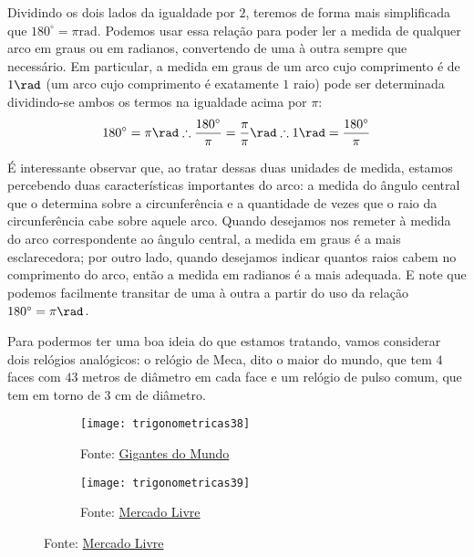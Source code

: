 Dividindo os dois lados da igualdade por $2$, teremos de forma mais simplificada que $180^{\circ}=\pi \mathrm{rad}$. Podemos usar essa relação para poder ler a medida de qualquer arco em graus ou em radianos, convertendo de uma à outra sempre que necessário. Em particular, a medida em graus de um arco cujo comprimento é de $1\rad$ (um arco cujo comprimento é exatamente $1$ raio) pode ser determinada dividindo-se ambos os termos na igualdade acima por $\pi$:
\begin{equation*}
180^{\circ}=\pi \rad\therefore\frac{180^{\circ}}{\pi}=\frac{\pi}{\pi} \rad\therefore1 \rad=\frac{180^{\circ}}{\pi}
\end{equation*}

\begin{observation}{}
É interessante observar que, ao tratar dessas duas unidades de medida, estamos percebendo duas características importantes do arco: a medida do ângulo central que o determina sobre a circunferência e a quantidade de vezes que o raio da circunferência cabe sobre aquele arco. Quando desejamos nos remeter à medida do arco correspondente ao ângulo central, a medida em graus é a mais esclarecedora; por outro lado, quando desejamos indicar quantos raios cabem no comprimento do arco, então a medida em radianos é a mais adequada. E note que podemos facilmente transitar de uma à outra a partir do uso da relação $180^{\circ}=\pi\rad$.
\end{observation}


Para podermos ter uma boa ideia do que estamos tratando, vamos considerar dois relógios analógicos: o relógio de Meca, dito o maior do mundo, que tem $4$ faces com $43$ metros de diâmetro em cada face e um relógio de pulso comum, que tem em torno de $3$ cm de diâmetro.

\begin{figure}[H]
\centering

\begin{minipage}{.45\linewidth}
\begin{figure}[H]
\centering

\texttt{[image: trigonometricas38]}
\caption{Fonte: \href{https://gigantesdomundo.blogspot.com/2012/11/o-maior-relogio-do-mundo.html}{Gigantes do Mundo}}
\label{}
\end{figure}
\end{minipage}
\hspace{2em}
\begin{minipage}{.45\linewidth}
\begin{figure}[H]
\centering

\texttt{[image: trigonometricas39]}
\caption{Fonte: \href{https://produto.mercadolivre.com.br/MLB-1160291326-relogio-pulso-personalizado-com-foto-imagem-logo-promoco-_JM}{Mercado Livre}}
\label{}
\end{figure}
\end{minipage}
\end{figure}

